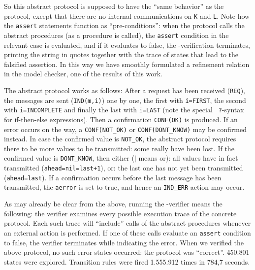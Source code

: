 So this abstract protocol  is supposed to have the ``same behavior'' as
the  protocol, except  that there  are  no internal  communications on
{\tt K}  and  {\tt L}. Note how the {\tt assert} statements function
as ``pre-conditions'': when the  protocol calls the abstract procedures (as
a procedure  is called), the  {\tt assert} condition  in the  relevant
case   is   evaluated,   and   if   it   evaluates   to   false,   the
\Murphi{}-verification terminates, printing the string in quotes  
together  with  the   trace of states   that  lead  to  the  falsified
assertion.   In   this way  we have smoothly   formulated a refinement
relation in the model checker, one of the results of this work.

The abstract  protocol  works as   follows: After  a request has  been
received ({\tt  REQ}), the messages  are sent ({\tt IND(m,i)})  one by
one, the first with {\tt i=FIRST},  the second with {\tt i=INCOMPLETE}
and  finally   the last   with {\tt  i=LAST}    (note the special {\tt
?}-syntax  for    \Murphi{}   if-then-else  expressions).     Then   a
confirmation  {\tt CONF(OK)} is  produced.  If an  error occurs on the
way, a {\tt CONF(NOT\_OK)} or  {\tt CONF(DONT\_KNOW)} may be confirmed
instead. In case  the confirmed value is  {\tt NOT\_OK}, the  abstract
protocol  requires there  to be more   values to be transmitted:  some
really have been  lost. If the  confirmed  value is {\tt  DONT\_KNOW},
then  either ($\vert$ means  or): all values  have in fact transmitted
({\tt ahead=nil}{\tt =last+1}), or: the last one has
not yet been transmitted ({\tt ahead=last}).  If a confirmation occurs
before the last message has been transmitted, the  {\tt aerror} is set
to true, and hence an {\tt IND\_ERR} action may occur.

As may already be clear from the above, running the \Murphi{}-verifier
means the following:   the verifier examines every possible  execution
trace of the concrete protocol.   Each such trace will ``include'' calls
of  the abstract   procedures whenever  an  external action  is
performed.  If one of these calls evaluate an {\tt assert} condition to
false, the verifier terminates   while indicating the error.  When  we
verified   the above  protocol,  no  such  error  states  occurred: the
protocol was   ``correct''. 450.801  states were  explored. Transition
rules were fired 1.555.912 times in 784,7 seconds.

